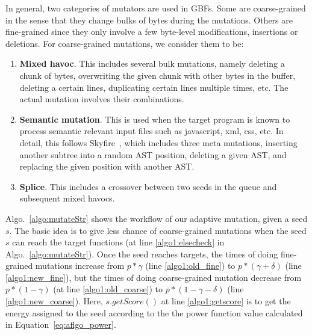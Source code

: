 In general, two categories of mutators are used in GBFs. Some are coarse-grained in the sense that they change bulks of bytes during the mutations. Others are fine-grained since they only involve a few byte-level modifications, insertions or deletions. For coarse-grained mutations, we consider them to be:
\begin{enumerate}[(1)] 
	\item \textbf{Mixed havoc}. This includes several bulk mutations, namely deleting a chunk of bytes, overwriting the given chunk with other bytes in the buffer, deleting a certain lines, duplicating certain lines multiple times, etc. The actual mutation involves their combinations.
	\item \textbf{Semantic mutation}. This is used when the target program is known to process semantic relevant input files such as javascript, xml, css, etc. In detail, this follows Skyfire~\cite{junjie:2017sp:skyfire}, which includes three meta mutations, inserting another subtree into a random AST position, deleting a given AST, and replacing the given position with another AST.
	\item \textbf{Splice}. This includes a crossover between two seeds in the queue and subsequent mixed havocs.
\end{enumerate}


Algo.~\ref{algo:mutateStr} shows the workflow of our adaptive mutation, given a seed $s$. 
The basic idea is to give less chance of coarse-grained mutations when the seed $s$ can reach the target functions (at line \ref{algo1:elsecheck} in Algo.~\ref{algo:mutateStr}). Once the seed reaches targets, the times of doing fine-grained mutations increase from  $ p * 	\gamma$ (line \ref{algo1:old_fine}) to $p *(	\gamma + \delta)$ (line \ref{algo1:new_fine}), but the times of doing coarse-grained mutation decrease from  $ p *(1- 	\gamma )$ (at line \ref{algo1:old_coarse}) to $p *(1- 	\gamma -\delta )$ (line \ref{algo1:new_coarse}). Here, $s.getScore()$ at line \ref{algo1:getscore} is to get the energy assigned to the seed according to the the power function value calculated in Equation~\ref{eq:aflgo_power}.

